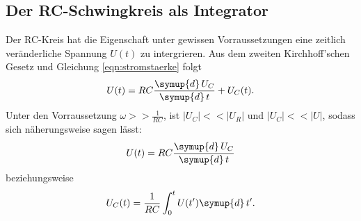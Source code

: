 \subsection{Der RC-Schwingkreis als Integrator}
    Der RC-Kreis hat die Eigenschaft unter gewissen Vorraussetzungen eine zeitlich veränderliche Spannung $U(t)$ zu intergrieren. 
    Aus dem zweiten Kirchhoff'schen Gesetz und Gleichung \eqref{eqn:stromstaerke} folgt
    \begin{equation}
        \label{eqn:spannungint}
        U(t) = R C \frac{\symup{d} \, U_C} {\symup{d} \, t} + U_C(t).
    \end{equation}
    Unter den Vorraussetzung $\omega >> \frac{1}{R C}$, ist $\lvert U_C \rvert << \lvert U_R \rvert $ und $\lvert U_C \rvert << \lvert U \rvert $, 
    sodass sich näherungsweise sagen lässt:
    \begin{equation}
        \label{eqn:int1}
        U(t) = R C \frac{\symup{d} \, U_C} {\symup{d} \, t}
    \end{equation}
    beziehungsweise
    \begin{equation}
        \label{eqn:int2}
        U_C(t) = \frac {1} {R C} \int_0^{t} U(t') \symup{d} \, t'.    
    \end{equation}    